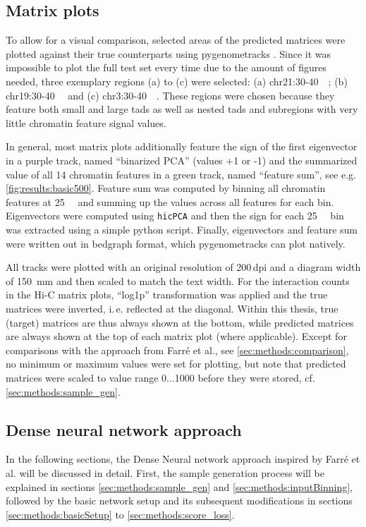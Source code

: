 \subsection{Matrix plots} \label{sec:methods:matrix_plots}
To allow for a visual comparison, selected areas of the predicted matrices were plotted against their true counterparts using pygenometracks \cite{LopezDelisle2020}.
Since it was impossible to plot the full test set every time due to the amount of figures needed, 
three exemplary regions (a) to (c) were selected: (a) chr21:30-\SI{40}{\mega\bp}; (b) chr19:30-\SI{40}{\mega\bp} and (c) chr3:30-\SI{40}{\mega\bp}.
These regions were chosen because they feature both small and large \acrshort{tad}s as well as nested \acrshort{tad}s and subregions with very little chromatin feature signal values.

In general, most matrix plots additionally feature the sign of the first eigenvector in a purple track, named ``binarized PCA'' (values +1 or -1)
and the summarized value of all 14 chromatin features in a green track, named ``feature sum'', see e.g. \cref{fig:results:basic500}.
Feature sum was computed by binning all chromatin features at \SI{25}{\kilo\bp} and 
summing up the values across all features for each bin.
Eigenvectors were computed using \texttt{hicPCA} \cite{Wolff2018} and then the sign for each \SI{25}{\kilo\bp} bin was extracted using 
a simple python script. Finally, eigenvectors and feature sum were written out in bedgraph format, which pygenometracks can plot natively.

All tracks were plotted with an original resolution of 200\,dpi and a diagram width of \SI{150}{\mm} and then scaled to match the text width.
For the interaction counts in the Hi-C matrix plots, ``log1p'' transformation was applied and the true matrices were inverted,
i.\,e. reflected at the diagonal. Within this thesis, true (target) matrices are thus always shown at the bottom, while predicted matrices are always shown at the top
of each matrix plot (where applicable).
Except for comparisons with the approach from Farr\'e et al., see \cref{sec:methods:comparison},
no minimum or maximum values were set for plotting, but note that predicted matrices were scaled to value range 0...1000 
before they were stored, cf. \cref{sec:methods:sample_gen}.

\subsection{Dense neural network approach} \label{sec:methods:dnn}
In the following sections, the Dense Neural network approach inspired by Farr\'e et al. \cite{Farre2018a}
will be discussed in detail.
First, the sample generation process will be explained in sections \ref{sec:methods:sample_gen} and \ref{sec:methods:inputBinning}, 
followed by the basic network setup and its subsequent modifications in sections \ref{sec:methods:basicSetup} to \ref{sec:methods:score_loss}.

